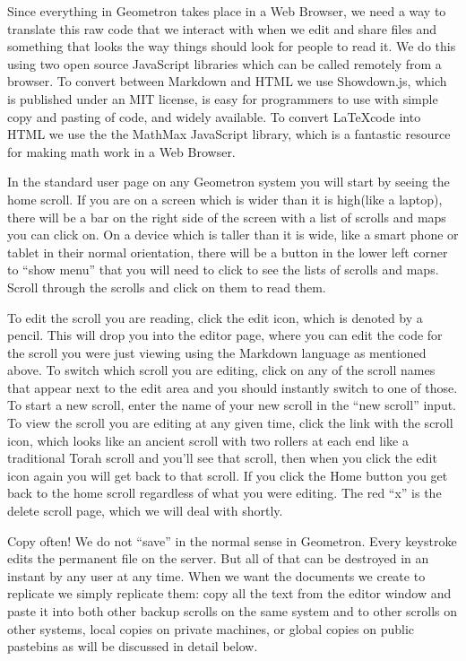 Since everything in Geometron takes place in a Web Browser, we need a way to translate this raw code that we interact with when we edit and share files and something that looks the way things should look for people to read it.  We do this using two open source JavaScript libraries which can be called remotely from a browser. To convert between Markdown and HTML we use Showdown.js, which is published under an MIT license, is easy for programmers to use with simple copy and pasting of code, and widely available.  To convert \LaTeX code into HTML we use the the MathMax JavaScript library, which is a fantastic resource for making math work in a Web Browser.

In the standard user page on any Geometron system you will start by seeing the home scroll.  If you are on a screen which is wider than it is high(like a laptop), there will be a bar on the right side of the screen with a list of scrolls and maps you can click on.  On a device which is taller than it is wide, like a smart phone or tablet in their normal orientation, there will be a button in the lower left corner to ``show menu'' that you will need to click to see the lists of scrolls and maps.  Scroll through the scrolls and click on them to read them.  

To edit the scroll you are reading, click the edit icon, which is denoted by a pencil.   This will drop you into the editor page, where you can edit the code for the scroll you were just viewing using the Markdown language as mentioned above.  To switch which scroll you are editing, click on any of the scroll names that appear next to the edit area and you should instantly switch to one of those.  To start a new scroll, enter the name of your new scroll in the ``new scroll'' input.  To view the scroll you are editing at any given time, click the link with the scroll icon, which looks like an ancient scroll with two rollers at each end like a traditional Torah scroll and you'll see that scroll, then when you click the edit icon again you will get back to that scroll.  If you click the Home button you get back to the home scroll regardless of what you were editing.  The red ``x'' is the delete scroll page, which we will deal with shortly.

Copy often!  We do not ``save'' in the normal sense in Geometron. Every keystroke edits the permanent file on the server.  But all of that can be destroyed in an instant by any user at any time.  When we want the documents we create to replicate we simply replicate them: copy all the text from the editor window and paste it into both other backup scrolls on the same system and to other scrolls on other systems, local copies on private machines, or global copies on public pastebins as will be discussed in detail below.  

